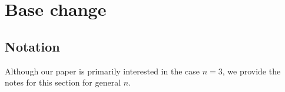 \chapter{Base change}
\section{Notation}
Although our paper is primarily interested in the case $n=3$,
we provide the notes for this section for general $n$.

